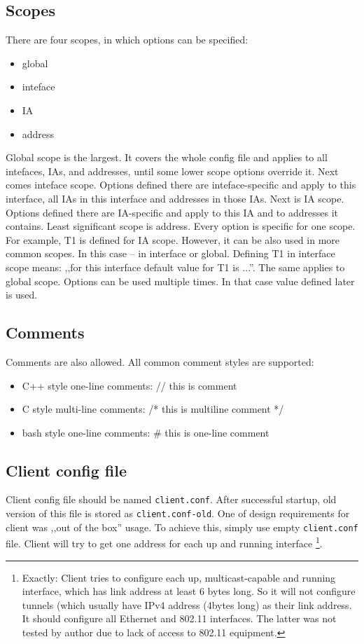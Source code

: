 \subsection{Scopes}
There are four scopes, in which options can be specified:
\begin{itemize}
\item global
\item inteface
\item IA
\item address
\end{itemize}

Global scope is the largest. It covers the whole config file and
applies to all intefaces, IAs, and addresses, until some lower scope
options override it. Next comes inteface scope. Options defined there
are inteface-specific and apply to this interface, all IAs in this
interface and addresses in those IAs. Next is IA scope. Options
defined there are IA-specific and apply to this IA and to addresses it
contains. Least significant scope is address. Every option is specific
for one scope. For example, T1 is defined for
IA scope. However, it can be also used in more common scopes. In this
case -- in interface or global. Defining T1 in interface scope means:
,,for this interface default value for T1 is ...''. The same applies
to global scope. Options can be used multiple times. In that case
value defined later is used.

\subsection{Comments}

Comments are also allowed. All common comment styles are supported:
\begin{itemize}
\item C++ style one-line comments: // this is comment
\item C style multi-line comments: /* this is multiline comment */
\item bash style one-line comments: \# this is one-line comment
\end{itemize}

\subsection{Client config file}

Client config file should be named \verb+client.conf+. After
successful startup, old version of this file is stored as
\verb+client.conf-old+. One of design requirements for client was
,,out of the box'' usage. To achieve this, simply use empty
\verb+client.conf+ file. Client will try to get one address for each up and
running interface \footnote{Exactly: Client tries to configure each
  up, multicast-capable and running interface, which has link address
  at least 6 bytes long. So it will not configure tunnels (which
  usually have IPv4 address (4bytes long) as their link address. It
  should configure all Ethernet and 802.11 interfaces. The latter was
  not tested by author due to lack of access to 802.11 equipment.}.

